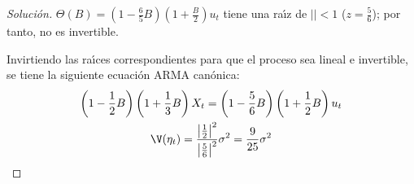 \begin{ejemplo}
\begin{enumerate}
\begin{proof}[Soluci\'{o}n]
$\Theta (B)=\left( {1-\frac{6}{5}B} \right)\left( {1+\frac{B}{2}} 
\right)u_{t} $ tiene una ra\'{\i}z de $\left| \right|< 1$ ($z=\frac{5}{6}$); por tanto, no es invertible.

Invirtiendo las ra\'{\i}ces correspondientes para que el proceso sea lineal 
e invertible, se tiene la siguiente ecuaci\'{o}n ARMA can\'{o}nica:
\begin{gather*}
\left(1-\frac{1}{2}B\right)\left(1+\frac{1}{3}B\right)X_{t} =\left(1-\frac{5}{6}B\right)\left(1+\frac{1}{2}B\right)u_{t} 
\\
\V(\eta_{t} )=\frac{\left| {\frac{1}{2}} \right|^{2}}{\left| {\frac{5}{6}} 
\right|^{2}}\sigma^{2}=\frac{9}{25}\sigma^{2}
\end{gather*}
\end{proof}
\end{enumerate}
\end{ejemplo}



